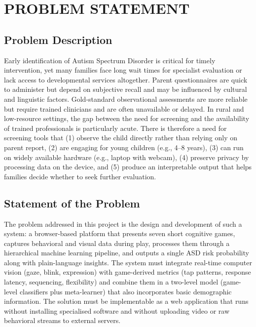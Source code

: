 \documentclass[12pt,a4paper]{report}
\begin{document}
\chapter{PROBLEM STATEMENT}
\section{Problem Description}
Early identification of Autism Spectrum Disorder is critical for timely intervention, yet many families face long wait times for specialist evaluation or lack access to developmental services altogether. Parent questionnaires are quick to administer but depend on subjective recall and may be influenced by cultural and linguistic factors. Gold-standard observational assessments are more reliable but require trained clinicians and are often unavailable or delayed. In rural and low-resource settings, the gap between the need for screening and the availability of trained professionals is particularly acute. There is therefore a need for screening tools that (1) observe the child directly rather than relying only on parent report, (2) are engaging for young children (e.g., 4--8 years), (3) can run on widely available hardware (e.g., laptop with webcam), (4) preserve privacy by processing data on the device, and (5) produce an interpretable output that helps families decide whether to seek further evaluation.
\section{Statement of the Problem}
The problem addressed in this project is the design and development of such a system: a browser-based platform that presents seven short cognitive games, captures behavioral and visual data during play, processes them through a hierarchical machine learning pipeline, and outputs a single ASD risk probability along with plain-language insights. The system must integrate real-time computer vision (gaze, blink, expression) with game-derived metrics (tap patterns, response latency, sequencing, flexibility) and combine them in a two-level model (game-level classifiers plus meta-learner) that also incorporates basic demographic information. The solution must be implementable as a web application that runs without installing specialised software and without uploading video or raw behavioral streams to external servers.
\end{document}
